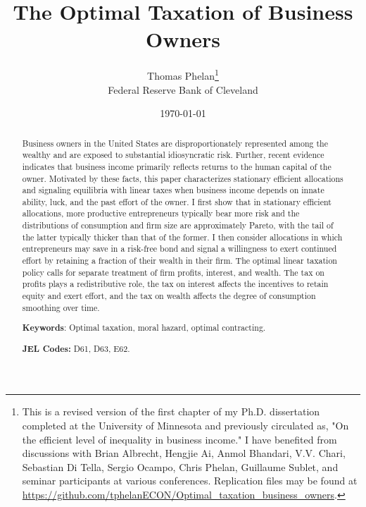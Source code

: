 \documentclass[11pt]{article}
\theoremstyle{plain}
\begin{document}
\title{The Optimal Taxation of Business Owners}
\date{\today} 
\author{Thomas Phelan\thanks{This is a revised version of the first chapter of my Ph.D. dissertation completed at the University of Minnesota and previously circulated as, "On the efficient level of inequality in business income." I have benefited from discussions with Brian Albrecht, Hengjie Ai, Anmol Bhandari, V.V. Chari, Sebastian Di Tella, Sergio Ocampo, Chris Phelan, Guillaume Sublet, and seminar participants at various conferences. Replication files may be found at \href{https://github.com/tphelanECON/Optimal_taxation_business_owners}{https://github.com/tphelanECON/Optimal\_taxation\_business\_owners}.} \\ Federal Reserve Bank of Cleveland}


\maketitle

\begin{abstract} 
Business owners in the United States are disproportionately represented among the wealthy and are exposed to substantial idiosyncratic risk. Further, recent evidence indicates that business income primarily reflects returns to the human capital of the owner. Motivated by these facts, this paper characterizes stationary efficient allocations and signaling equilibria with linear taxes when business income depends on innate ability, luck, and the past effort of the owner. I first show that in stationary efficient allocations, more productive entrepreneurs typically bear more risk and the distributions of consumption and firm size are approximately Pareto, with the tail of the latter typically thicker than that of the former. I then consider allocations in which entrepreneurs may save in a risk-free bond and signal a willingness to exert continued effort by retaining a fraction of their wealth in their firm. The optimal linear taxation policy calls for separate treatment of firm profits, interest, and wealth. The tax on profits plays a redistributive role, the tax on interest affects the incentives to retain equity and exert effort, and the tax on wealth affects the degree of consumption smoothing over time.  

\smallskip

\textbf{Keywords}: Optimal taxation, moral hazard, optimal contracting.

\smallskip

\textbf{JEL Codes:} D61, D63, E62.

\end{abstract}
\end{document}

